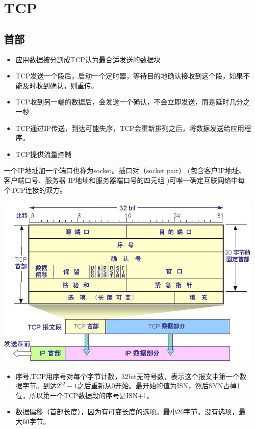 \section{TCP}

\subsection{首部}

\begin{itemize}
\item 应用数据被分割成TCP认为最合适发送的数据块
\item TCP发送一个段后，启动一个定时器，等待目的地确认接收到这个段，如果不能及时收到确认，则重传。
\item TCP收到另一端的数据后，会发送一个确认，不会立即发送，而是延时几分之一秒
\item TCP通过IP传送，到达可能失序，TCP会重新排列之后，将数据发送给应用程序。
\item TCP提供流量控制

\end{itemize}


一个IP地址加一个端口也称为socket。插口对（socket pair） (包含客户IP地址、客户端口号、服务器 IP地址和服务器端口号的四元组 )可唯一确定互联网络中每个TCP连接的双方。

\includegraphics[scale=3]{protocol/resources/TCP-header.jpg}


\begin{itemize}
\item 序号,TCP用序号对每个字节计数，32bit无符号数，表示这个报文中第一个数据字节。到达$2^{32} - 1$之后重新从0开始。最开始的值为ISN，然后SYN占掉1位，所以第一个TCP数据段的序号是ISN+1。

\item 数据偏移（首部长度），因为有可变长度的选项。最小20字节，没有选项，最大60字节。

\end{itemize}

